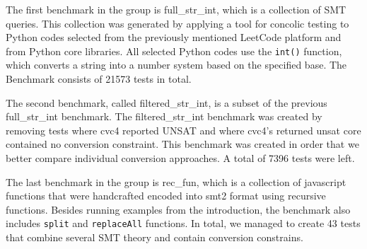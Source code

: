 {The first benchmark in the group is full\_str\_int, which is a collection of SMT queries. This collection was generated by applying a tool for concolic testing to Python codes selected from the previously mentioned LeetCode platform and from Python core libraries. All selected Python codes use the \texttt{int()} function, which converts a string into a number system based on the specified base. The Benchmark consists of 21573 tests in total.

The second benchmark, called filtered\_str\_int, is a subset of the previous full\_str\_int benchmark. The filtered\_str\_int benchmark was created by removing tests where cvc4 reported UNSAT and where cvc4's returned unsat core contained no conversion constraint. This benchmark was created in order that we better compare individual conversion approaches. A total of 7396 tests were left.

The last benchmark in the group is rec\_fun, which is a collection of javascript functions that were handcrafted encoded into smt2 format using recursive functions. Besides running examples from the introduction, the benchmark also includes \texttt{split} and \texttt{replaceAll} functions. In total, we managed to create 43 tests that combine several SMT theory and contain conversion constrains.
}

